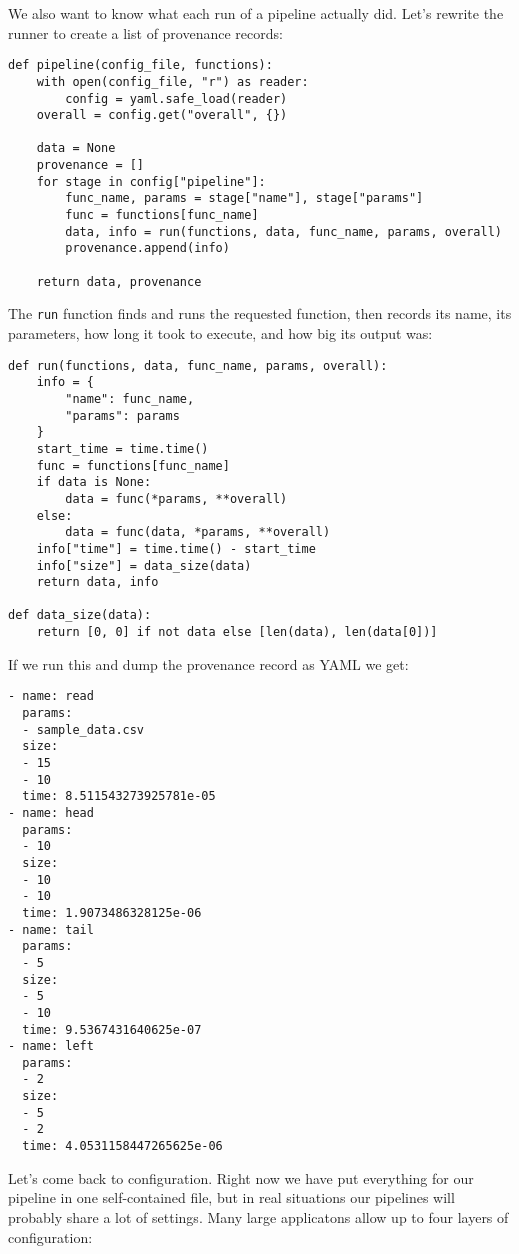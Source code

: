 \documentclass{scrbook}
\begin{document}
We also want to know what each run of a pipeline actually did.
Let's rewrite the runner to create a list of provenance records:


\begin{lstlisting}[frame=single,frameround=tttt]
def pipeline(config_file, functions):
    with open(config_file, "r") as reader:
        config = yaml.safe_load(reader)
    overall = config.get("overall", {})

    data = None
    provenance = []
    for stage in config["pipeline"]:
        func_name, params = stage["name"], stage["params"]
        func = functions[func_name]
        data, info = run(functions, data, func_name, params, overall)
        provenance.append(info)

    return data, provenance
\end{lstlisting}



The \texttt{run} function finds and runs the requested function,
then records its name,
its parameters,
how long it took to execute,
and how big its output was:


\begin{lstlisting}[frame=single,frameround=tttt]
def run(functions, data, func_name, params, overall):
    info = {
        "name": func_name,
        "params": params
    }
    start_time = time.time()
    func = functions[func_name]
    if data is None:
        data = func(*params, **overall)
    else:
        data = func(data, *params, **overall)
    info["time"] = time.time() - start_time
    info["size"] = data_size(data)
    return data, info

def data_size(data):
    return [0, 0] if not data else [len(data), len(data[0])]
\end{lstlisting}



If we run this and dump the provenance record as YAML we get:


\begin{lstlisting}[frame=single,frameround=tttt]
- name: read
  params:
  - sample_data.csv
  size:
  - 15
  - 10
  time: 8.511543273925781e-05
- name: head
  params:
  - 10
  size:
  - 10
  - 10
  time: 1.9073486328125e-06
- name: tail
  params:
  - 5
  size:
  - 5
  - 10
  time: 9.5367431640625e-07
- name: left
  params:
  - 2
  size:
  - 5
  - 2
  time: 4.0531158447265625e-06
\end{lstlisting}



Let's come back to configuration.
Right now we have put everything for our pipeline in one self-contained file,
but in real situations our pipelines will probably share a lot of settings.
Many large applicatons allow up to four layers of configuration:
\end{document}
